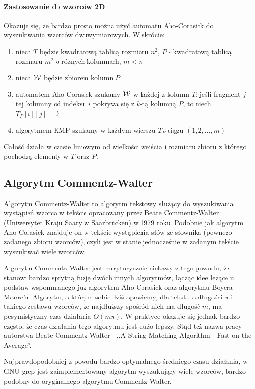 \paragraph{Zastosowanie do wzorców 2D}
Okazuje się, że bardzo prosto można użyć automatu Aho-Corasick do wyszukiwania wzorców dwuwymiarowych. W skrócie:
\begin{enumerate}
    \item niech $T$ będzie kwadratową tablicą rozmiaru $n^2$, $P$ - kwadratową tablicą rozmiaru $m^2$ o różnych kolumnach, $m < n$
    \item niech $\operatorname{\mathcal{W}}$ będzie zbiorem kolumn $P$
    \item automatem Aho-Corasick szukamy $\operatorname{\mathcal{W}}$ w każdej z kolumn $T$; jeśli fragment $j$-tej kolumny od indeksu $i$ pokrywa się z $k$-tą kolumną $P$, to niech $T_P[i][j]=k$
    \item algorytmem KMP szukamy w każdym wierszu $T_P$ ciągu $(1,2,...,m)$
\end{enumerate}
Całość działa w czasie liniowym od wielkości wejścia i rozmiaru zbioru z którego pochodzą elementy w $T$ oraz $P$.


\subsection{Algorytm Commentz-Walter}
Algorytm Commentz-Walter to algorytm tekstowy służący do wyszukiwania wystąpień wzorca w tekście opracowany przez Beate Commentz-Walter (Uniwersytet Kraju Saary w Saarbrücken) w 1979 roku. Podobnie jak algorytm Aho-Corasick znajduje on w tekście wystąpienia słów ze słownika (pewnego zadanego zbioru wzorców), czyli jest w stanie jednocześnie w zadanym tekście wyszukiwać wiele wzorców. 

Algorytm Commentz-Walter jest merytorycznie ciekawy z tego powodu, że stanowi bardzo sprytną fuzję dwóch innych algorytmów, łącząc idee leżące u podstaw wspomnianego już algorytmu Aho-Corasick oraz algorytmu Boyera-Moore'a. Algorytm, o którym sobie dziś opowiemy, dla tekstu o długości $n$ i takiego zestawu wzorców, że najdłuższy spośród nich ma długość $m$, ma pesymistyczny czas działania $O(mn)$. W praktyce okazuje się jednak bardzo często, że czas działania tego algorytmu jest dużo lepszy. Stąd też nazwa pracy autorstwa Beate Commentz-Walter - ,,A String Matching Algorithm - Fast on the Average''. 

Najprawdopodobniej z powodu bardzo optymalnego średniego czasu działania, w GNU grep jest zaimplementowany algorytm wyszukujący wiele wzorców, bardzo podobny do oryginalnego algorytmu Commentz-Walter.

